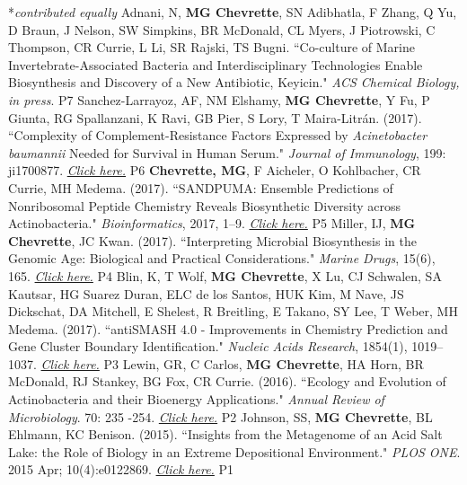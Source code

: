 


\begin{cvpubs}
  \cvpub
    {\hspace{-1cm} *\textit{contributed equally}} %
    {} %
  \cvpub
    {Adnani, N, \textbf{MG Chevrette}, SN Adibhatla, F Zhang, Q Yu, D Braun, J Nelson, SW Simpkins, BR McDonald, CL Myers, J Piotrowski, C Thompson, CR Currie, L Li, SR Rajski, TS Bugni. ``Co-culture of Marine Invertebrate-Associated Bacteria and Interdisciplinary Technologies Enable Biosynthesis and Discovery of a New Antibiotic, Keyicin." \textit{ACS Chemical Biology, in press}.} %
    {P7} %
  \cvpub
    {Sanchez-Larrayoz, AF, NM Elshamy, \textbf{MG Chevrette}, Y Fu, P Giunta, RG Spallanzani, K Ravi, GB Pier, S Lory, T Maira-Litr\'{a}n. (2017). ``Complexity of Complement-Resistance Factors Expressed by \textit{Acinetobacter baumannii} Needed for Survival in Human Serum." \textit{Journal of Immunology}, 199: ji1700877. \textit{\href{https://doi.org/10.4049/jimmunol.1700877}{Click here.}} }%
    {P6} %
  \cvpub
    {\textbf{Chevrette, MG}, F Aicheler, O Kohlbacher, CR Currie, MH Medema. (2017). ``SANDPUMA: Ensemble Predictions of Nonribosomal Peptide Chemistry Reveals Biosynthetic Diversity across Actinobacteria." \textit{Bioinformatics}, 2017, 1–9. \textit{\href{https://doi.org/10.1093/bioinformatics/btx400}{Click here.}} } %
    {P5} %
  \cvpub
    {Miller, IJ, \textbf{MG Chevrette}, JC Kwan. (2017). ``Interpreting Microbial Biosynthesis in the Genomic Age: Biological and Practical Considerations." \textit{Marine Drugs}, 15(6), 165. \textit{\href{https://doi.org/10.3390/md15060165}{Click here.}} } %
    {P4} %
  \cvpub
    {Blin, K, T Wolf, \textbf{MG Chevrette}, X Lu, CJ Schwalen, SA Kautsar, HG Suarez Duran, ELC de los Santos, HUK Kim, M Nave, JS Dickschat, DA Mitchell, E Shelest, R Breitling, E Takano, SY Lee, T Weber, MH Medema. (2017). ``antiSMASH 4.0 - Improvements in Chemistry Prediction and Gene Cluster Boundary Identification." \textit{Nucleic Acids Research}, 1854(1), 1019–1037. \textit{\href{https://doi.org/10.1093/nar/gkx319}{Click here.}} }  %
    {P3} %
  \cvpub
    {Lewin, GR, C Carlos, \textbf{MG Chevrette}, HA Horn, BR McDonald, RJ Stankey, BG Fox, CR Currie. (2016). ``Ecology and Evolution of Actinobacteria and their Bioenergy Applications." \textit{Annual Review of Microbiology}. 70: 235 -254. \textit{\href{https://doi.org/10.1146/annurev-micro-102215-095748}{Click here.}} } %
    {P2} %
  \cvpub
    {Johnson, SS, \textbf{MG Chevrette}, BL Ehlmann, KC Benison. (2015). ``Insights from the Metagenome of an Acid Salt Lake: the Role of Biology in an Extreme Depositional Environment."  \textit{PLOS ONE}. 2015 Apr; 10(4):e0122869. \textit{\href{https://doi.org/10.1371/journal.pone.0122869}{Click here.}} } %
    {P1} %
\end{cvpubs}

